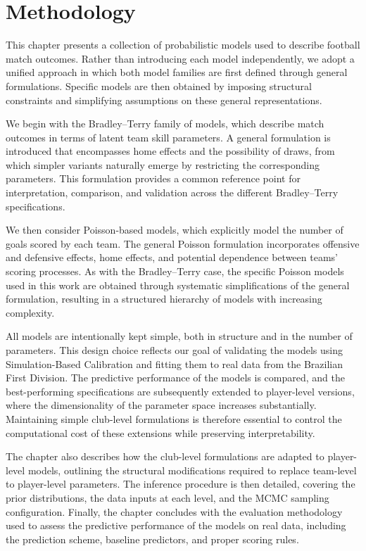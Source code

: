 \chapter{Methodology}
\label{methodology}

This chapter presents a collection of probabilistic models used to describe football match outcomes.
Rather than introducing each model independently, we adopt a unified approach in which both model families are first defined through general formulations.
Specific models are then obtained by imposing structural constraints and simplifying assumptions on these general representations.

We begin with the Bradley–Terry family of models, which describe match outcomes in terms of latent team skill parameters.
A general formulation is introduced that encompasses home effects and the possibility of draws, from which simpler variants naturally emerge by restricting the corresponding parameters.
This formulation provides a common reference point for interpretation, comparison, and validation across the different Bradley–Terry specifications.

We then consider Poisson-based models, which explicitly model the number of goals scored by each team.
The general Poisson formulation incorporates offensive and defensive effects, home effects, and potential dependence between teams’ scoring processes.
As with the Bradley–Terry case, the specific Poisson models used in this work are obtained through systematic simplifications of the general formulation, resulting in a structured hierarchy of models with increasing complexity.

All models are intentionally kept simple, both in structure and in the number of parameters.
This design choice reflects our goal of validating the models using Simulation-Based Calibration and fitting them to real data from the Brazilian First Division.
The predictive performance of the models is compared, and the best-performing specifications are subsequently extended to player-level versions, where the dimensionality of the parameter space increases substantially.
Maintaining simple club-level formulations is therefore essential to control the computational cost of these extensions while preserving interpretability.

The chapter also describes how the club-level formulations are adapted to player-level models, outlining the structural modifications required to replace team-level to player-level parameters.
The inference procedure is then detailed, covering the prior distributions, the data inputs at each level, and the MCMC sampling configuration.
Finally, the chapter concludes with the evaluation methodology used to assess the predictive performance of the models on real data, including the prediction scheme, baseline predictors, and proper scoring rules.










